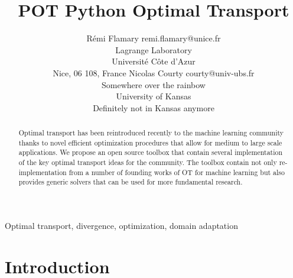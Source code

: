 \documentclass[twoside,11pt]{article}
\begin{document}
\title{POT Python Optimal Transport}

\author{\name Rémi Flamary \email remi.flamary@unice.fr \\
       \addr Lagrange Laboratory\\
       Université Côte d'Azur\\
       Nice, 06 108, France
       \AND
       \name Nicolas Courty \email courty@univ-ubs.fr \\
       \addr Somewhere over the rainbow\\
       University of Kansas\\
       Definitely not in Kansas anymore}

\editor{}

\maketitle

\begin{abstract}%
Optimal transport has been reintroduced recently to the machine
learning community thanks to novel efficient optimization procedures that
allow for medium to large scale applications. We propose an open source
toolbox that contain several implementation of the key optimal
transport ideas for the community. The toolbox contain not only
re-implementation from a number of founding works of OT for machine
learning but also provides generic solvers that can be used for more
fundamental research.
\end{abstract}

\begin{keywords}
  Optimal transport, divergence, optimization, domain adaptation
\end{keywords}

\section{Introduction}






\newpage







\vskip 0.2in

\end{document}
